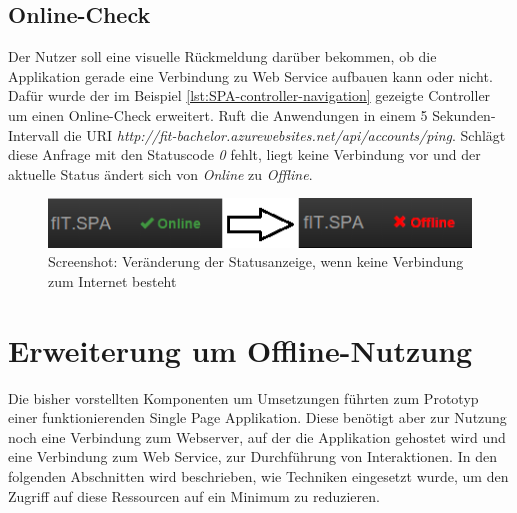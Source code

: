 \subsection{Online-Check}
\label{ssec:Online-Check}
Der Nutzer soll eine visuelle Rückmeldung darüber bekommen, ob die Applikation gerade eine Verbindung zu Web Service aufbauen kann oder nicht. Dafür wurde der im Beispiel \ref{lst:SPA-controller-navigation} gezeigte Controller um einen Online-Check erweitert. Ruft die Anwendungen in einem 5 Sekunden-Intervall die URI \textit{http://fit-bachelor.azurewebsites.net/api/accounts/ping}. Schlägt diese Anfrage mit den Statuscode \textit{0} fehlt, liegt keine Verbindung vor und der aktuelle Status ändert sich von \textit{Online} zu \textit{Offline}.
\begin{figure}[h]
\centering
\includegraphics[width=0.8\linewidth]{content/images/SPA-Online-Check}
\caption{Screenshot: Veränderung der Statusanzeige, wenn keine Verbindung zum Internet besteht}
\label{pic:SPA:OnlineCheck:Statusänderung}
\end{figure}

\section{Erweiterung um Offline-Nutzung}
\label{sec:CachedHttpService}
Die bisher vorstellten Komponenten um Umsetzungen führten zum Prototyp einer funktionierenden Single Page Applikation. Diese benötigt aber zur Nutzung noch eine Verbindung zum Webserver, auf der die Applikation gehostet wird und eine Verbindung zum Web Service, zur Durchführung von Interaktionen. In den folgenden Abschnitten wird beschrieben, wie Techniken eingesetzt wurde, um den Zugriff auf diese Ressourcen auf ein Minimum zu reduzieren. 

